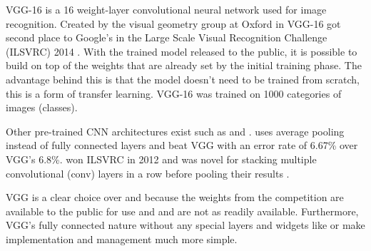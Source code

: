 VGG-16 is a 16 weight-layer convolutional neural network used for image recognition. Created by the visual geometry group at Oxford in \citeyear{vgg16-arxiv} VGG-16 got second place to Google's \gnet in the Large Scale Visual Recognition Challenge (ILSVRC) 2014 \cite{vgg16-arxiv}. With the trained model released to the public, it is possible to build on top of the weights that are already set by the initial training phase. The advantage behind this is that the model doesn't need to be trained from scratch, this is a form of transfer learning. VGG-16 was trained on 1000 categories of images (classes).

Other pre-trained CNN architectures exist such as \gnet and \anet. \gnet uses average pooling instead of fully connected layers \cite{googlenet-paper} and beat VGG with an error rate of 6.67\% over VGG's 6.8\%. \anet won ILSVRC in 2012 and was novel for stacking multiple convolutional (conv) layers in a row before pooling their results \cite{alexnet-paper}. %

VGG is a clear choice over \gnet and \anet because the weights from the competition are available to the public for use and \anet and \gnet are not as readily available. Furthermore, VGG's fully connected nature without any special layers and widgets like \anet or \gnet make implementation and management much more simple. %


